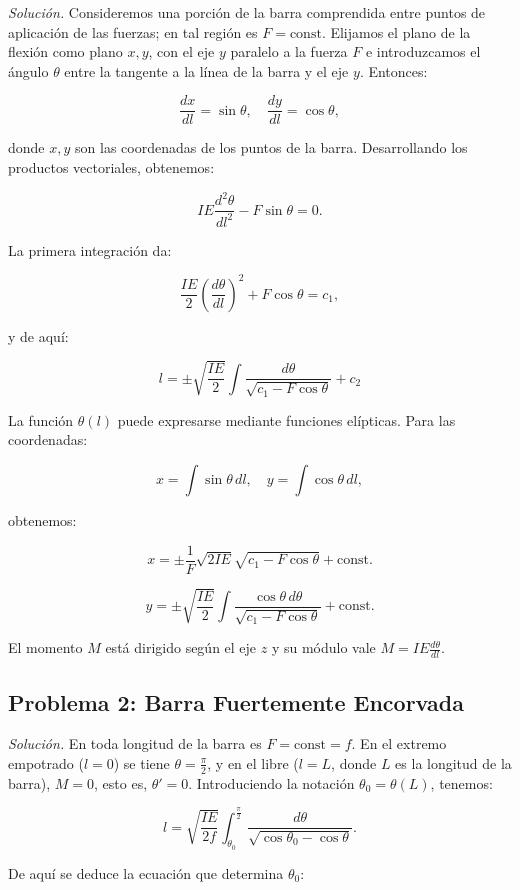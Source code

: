 \documentclass{article}
\begin{document}
\textit{Solución.} Consideremos una porción de la barra comprendida entre puntos de aplicación de las fuerzas; en tal región es $F = \text{const}$. Elijamos el plano de la flexión como plano $x, y$, con el eje $y$ paralelo a la fuerza $F$ e introduzcamos el ángulo $\theta$ entre la tangente a la línea de la barra y el eje $y$. Entonces:

$$
\frac{dx}{dl} = \sin \theta, \quad \frac{dy}{dl} = \cos \theta,
$$

donde $x, y$ son las coordenadas de los puntos de la barra. Desarrollando los productos vectoriales, obtenemos:

$$
IE \frac{d^2 \theta}{dl^2} - F \sin \theta = 0.
$$

La primera integración da:

$$
\frac{IE}{2} \left( \frac{d\theta}{dl} \right)^2 + F \cos \theta = c_1,
$$

y de aquí:

$$
l = \pm \sqrt{\frac{IE}{2}} \int \frac{d\theta}{\sqrt{c_1 - F \cos \theta}} + c_2
$$

La función $\theta(l)$ puede expresarse mediante funciones elípticas. Para las coordenadas:

$$
x = \int \sin \theta \, dl, \quad y = \int \cos \theta \, dl,
$$

obtenemos:

$$
x = \pm \frac{1}{F} \sqrt{2IE} \sqrt{c_1 - F \cos \theta} + \text{const.}
$$

$$
y = \pm \sqrt{\frac{IE}{2}} \int \frac{\cos \theta \, d\theta}{\sqrt{c_1 - F \cos \theta}} + \text{const.}
$$

El momento $M$ está dirigido según el eje $z$ y su módulo vale $M = IE \frac{d\theta}{dl}$.

\subsection*{Problema 2: Barra Fuertemente Encorvada}

\textit{Solución.} En toda longitud de la barra es $F = \text{const} = f$. En el extremo empotrado ($l = 0$) se tiene $\theta = \frac{\pi}{2}$, y en el libre ($l = L$, donde $L$ es la longitud de la barra), $M = 0$, esto es, $\theta' = 0$. Introduciendo la notación $\theta_0 = \theta(L)$, tenemos:

$$
l = \sqrt{\frac{IE}{2f}} \int_{\theta_0}^{\frac{\pi}{2}} \frac{d\theta}{\sqrt{\cos \theta_0 - \cos \theta}}.
$$

De aquí se deduce la ecuación que determina $\theta_0$:
\end{document}

